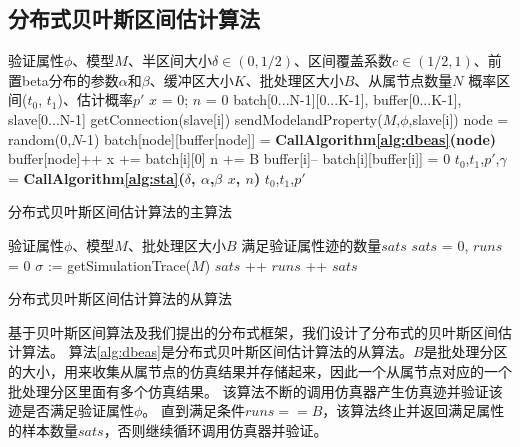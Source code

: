 \subsection{分布式贝叶斯区间估计算法}
\begin{algorithm}[t]
\begin{algorithmic}[1]
\REQUIRE 验证属性$\phi$、模型$M$、半区间大小$\delta \in (0, 1/2)$、区间覆盖系数$c \in (1/2, 1)$、前置beta分布的参数$\alpha$和$\beta$、缓冲区大小$K$、批处理区大小$B$、从属节点数量$N$
\ENSURE 概率区间($t_0$, $t_1$)、估计概率$p'$
\STATE $x$ = 0; $n$ = 0
\STATE batch[0...N-1][0...K-1], buffer[0...K-1], slave[0...N-1]
\LOOP 
\STATE getConnection(slave[i])
\STATE sendModelandProperty($M$,$\phi$,slave[i])
\RETURN
\ENDIF
\ENDLOOP
\LOOP
        \STATE node = random(0,$N$-1)
         \STATE batch[node][buffer[node]] = \textbf{CallAlgorithm\ref{alg:dbeas}(node)}
         \STATE buffer[node]++
         \ENDIF
         \LOOP
             \STATE x += batch[i][0]
              \STATE n += B
             \STATE buffer[i]--
             \STATE batch[i][buffer[i]] = 0
         \RETURN
         \ENDIF
         \ENDLOOP
         \ENDIF
         \STATE $t_0$,$t_1$,$p'$,$\gamma$ = \textbf{CallAlgorithm\ref{alg:sta}($\delta$, $\alpha$,$\beta$ $x$, $n$)}
         \RETURN $t_0$,$t_1$,$p'$
         \ENDIF
\ENDLOOP
\end{algorithmic}
\caption{分布式贝叶斯区间估计算法的主算法}
\label{alg:dbeam}
\end{algorithm}
\begin{algorithm}[t]
\begin{algorithmic}[1]
\REQUIRE 验证属性$\phi$、模型$M$、批处理区大小$B$
\ENSURE 满足验证属性迹的数量$sats$
\STATE $sats$ = 0, $runs$ = 0
\LOOP
        \STATE $\sigma$ := getSimulationTrace($M$)
        \IF{$\sigma \models \phi$}
        \STATE $sats$ ++
        \ENDIF
        \STATE $runs$ ++ 
        \RETURN $sats$
        \ENDIF
\ENDLOOP
\end{algorithmic}
\caption{分布式贝叶斯区间估计算法的从算法}
\label{alg:dbeas}
\end{algorithm}
基于贝叶斯区间算法及我们提出的分布式框架，我们设计了分布式的贝叶斯区间估计算法。 算法\ref{alg:dbeas}是分布式贝叶斯区间估计算法的从算法。$B$是批处理分区的大小，用来收集从属节点的仿真结果并存储起来，因此一个从属节点对应的一个批处理分区里面有多个仿真结果。 该算法不断的调用仿真器产生仿真迹并验证该迹是否满足验证属性$\phi$。 直到满足条件$runs == B$，该算法终止并返回满足属性的样本数量$sats$，否则继续循环调用仿真器并验证。

